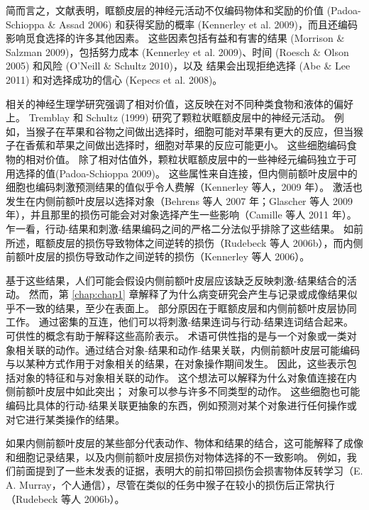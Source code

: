 简而言之，文献表明，眶额皮层的神经元活动不仅编码物体和奖励的价值 (Padoa-Schioppa \& Assad 2006) 和获得奖励的概率 (Kennerley et al. 2009)，而且还编码 影响觅食选择的许多其他因素。
这些因素包括有益和有害的结果 (Morrison \& Salzman 2009)，包括努力成本 (Kennerley et al. 2009)、时间 (Roesch \& Olson 2005) 和风险 (O'Neill \& Schultz 2010)，以及 结果会出现拒绝选择 (Abe \& Lee 2011) 和对选择成功的信心 (Kepecs et al. 2008)。\par


相关的神经生理学研究强调了相对价值，这反映在对不同种类食物和液体的偏好上。
Tremblay 和 Schultz (1999) 研究了颗粒状眶额皮层中的神经元活动。
例如，当猴子在苹果和谷物之间做出选择时，细胞可能对苹果有更大的反应，但当猴子在香蕉和苹果之间做出选择时，细胞对苹果的反应可能更小。
这些细胞编码食物的相对价值。
除了相对估值外，颗粒状眶额皮层中的一些神经元编码独立于可用选择的值(Padoa-Schioppa 2009)。
这些属性来自连接，但内侧前额叶皮层中的细胞也编码刺激预测结果的值似乎令人费解（Kennerley 等人，2009 年）。
激活也发生在内侧前额叶皮层以选择对象（Behrens 等人 2007 年；Glascher 等人 2009 年），并且那里的损伤可能会对对象选择产生一些影响（Camille 等人 2011 年）。
乍一看，行动-结果和刺激-结果编码之间的严格二分法似乎排除了这些结果。
如前所述，眶额皮层的损伤导致物体之间逆转的损伤（Rudebeck 等人 2006b），而内侧前额叶皮层的损伤导致动作之间逆转的损伤（Kennerley 等人 2006）。\par


基于这些结果，人们可能会假设内侧前额叶皮层应该缺乏反映刺激-结果结合的活动。
然而，第 \ref{chap:chap1} 章解释了为什么病变研究会产生与记录或成像结果似乎不一致的结果，至少在表面上。
部分原因在于眶额皮层和内侧前额叶皮层协同工作。
通过密集的互连，他们可以将刺激-结果连词与行动-结果连词结合起来。
可供性的概念有助于解释这些高阶表示。
术语可供性指的是与一个对象或一类对象相关联的动作。通过结合对象-结果和动作-结果关联，内侧前额叶皮层可能编码与以某种方式作用于对象相关的结果，在对象操作期间发生。
因此，这些表示包括对象的特征和与对象相关联的动作。
这个想法可以解释为什么对象值连接在内侧前额叶皮层中如此突出；
对象可以参与许多不同类型的动作。
这些细胞也可能编码比具体的行动-结果关联更抽象的东西，例如预测对某个对象进行任何操作或对它进行某类操作的结果。\par


如果内侧前额叶皮层的某些部分代表动作、物体和结果的结合，这可能解释了成像和细胞记录结果，以及内侧前额叶皮层损伤对物体选择的不一致影响。
例如，我们前面提到了一些未发表的证据，表明大的前扣带回损伤会损害物体反转学习（E. A. Murray，个人通信），尽管在类似的任务中猴子在较小的损伤后正常执行（Rudebeck 等人 2006b）。\par


